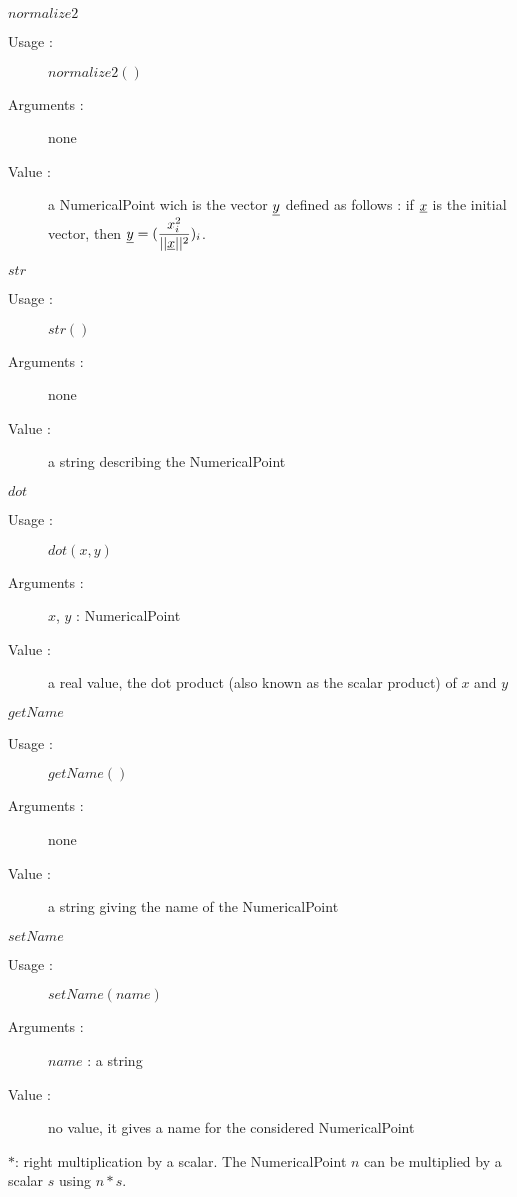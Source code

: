 \begin{description}
\begin{description}
  \item $normalize2$
    \begin{description}
    \item[Usage :] $normalize2()$
    \item[Arguments :] none
    \item[Value :] a NumericalPoint wich is the vector ${\underline{y}}$ defined as follows : if ${\underline{x}}$ is the initial vector, then  ${\underline{y}} = (\displaystyle \frac{x_i^2}{||{\underline{x}}||^2})_i$.
    \end{description}
    \bigskip

  \item $str$
    \begin{description}
    \item[Usage :] $str()$
    \item[Arguments :] none
    \item[Value :] a string describing the NumericalPoint
    \end{description}
    \bigskip

  \item $dot$
    \begin{description}
    \item[Usage :] $dot(x,y)$
    \item[Arguments :] $x$, $y$ : NumericalPoint
    \item[Value :] a real value, the dot product (also known as the scalar product) of $x$ and $y$
    \end{description}
    \bigskip

  \item $getName$
    \begin{description}
    \item[Usage :] $getName()$
    \item[Arguments :] none
    \item[Value :] a string giving the name of the NumericalPoint
    \end{description}
    \bigskip

  \item $setName$
    \begin{description}
    \item[Usage :] $setName(name)$
    \item[Arguments :] $name$ : a string
    \item[Value :] no value, it gives a name for the considered NumericalPoint
    \end{description}

  \item $*$: right multiplication by a scalar. The NumericalPoint $n$ can be multiplied by a scalar $s$ using $n * s$.
  \end{description}

\end{description}



